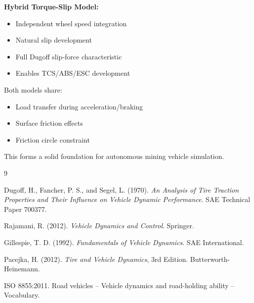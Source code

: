 \documentclass[11pt,a4paper]{article}
\begin{document}
\textbf{Hybrid Torque-Slip Model:}
\begin{itemize}
    \item Independent wheel speed integration
    \item Natural slip development
    \item Full Dugoff slip-force characteristic
    \item Enables TCS/ABS/ESC development
\end{itemize}

Both models share:
\begin{itemize}
    \item Load transfer during acceleration/braking
    \item Surface friction effects
    \item Friction circle constraint
\end{itemize}

This forms a solid foundation for autonomous mining vehicle simulation.

\begin{thebibliography}{9}

Dugoff, H., Fancher, P. S., and Segel, L. (1970).
\textit{An Analysis of Tire Traction Properties and Their Influence on Vehicle Dynamic Performance}.
SAE Technical Paper 700377.

Rajamani, R. (2012). \textit{Vehicle Dynamics and Control}. Springer.

Gillespie, T. D. (1992). \textit{Fundamentals of Vehicle Dynamics}. SAE International.

Pacejka, H. (2012). \textit{Tire and Vehicle Dynamics}, 3rd Edition. Butterworth-Heinemann.

ISO 8855:2011. Road vehicles -- Vehicle dynamics and road-holding ability -- Vocabulary.

\end{thebibliography}
\end{document}
